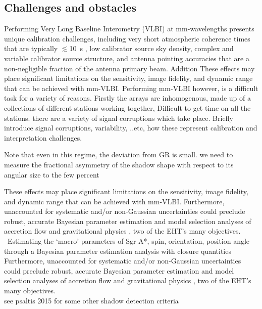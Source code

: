 \subsection{Challenges and obstacles}

Performing Very Long Baseline Interometry (VLBI) at mm-wavelengths presents unique calibration challenges, including very short atmospheric coherence times that are typically $\lesssim$10~s \citep{Doeleman_2009}, low calibrator source sky density, complex and variable calibrator source structure, and antenna pointing accuracies that are a non-negligible fraction of the antenna primary beam. Addition These effects may place significant limitations on the sensitivity, image fidelity, and dynamic range that can be achieved with mm-VLBI.  Performing mm-VLBI however, is a difficult task for a variety of reasons. Firstly the arrays are inhomogenous, made up of a collections of different stations working together, Difficult to get time on all the stations. there are a variety of signal corruptions which take place. Briefly introduce signal corruptions, variability, ..etc, how these represent calibration and interpretation challenges.

Note that even in this regime, the deviation from GR is small. we need to measure the fractional
asymmetry of the shadow shape with respect to its angular size to the few percent


 These effects may place significant limitations on the sensitivity, image fidelity, and dynamic range that can be achieved with mm-VLBI.  Furthermore, unaccounted for systematic and/or non-Gaussian uncertainties could preclude robust, accurate Bayesian parameter estimation and model selection analyses of accretion flow \citep[e.g.][]{Broderick_2016} and gravitational physics \citep[e.g.][]{Broderick_2014, Psaltis_2016}, two of the EHT's many objectives. 
~Estimating the `macro'-parameters of Sgr A*, spin, orientation, position angle through a Bayesian parameter estimation analysis with closure quantities\\
Furthermore, unaccounted for systematic and/or non-Gaussian uncertainties could preclude robust, accurate Bayesian parameter estimation and model selection analyses of accretion flow \citep[e.g.][]{Broderick_2016} and gravitational physics \citep[e.g.][]{Broderick_2014, Psaltis_2016}, two of the EHT's many objectives.
~\\
see psaltis 2015 for  some other shadow detection criteria


